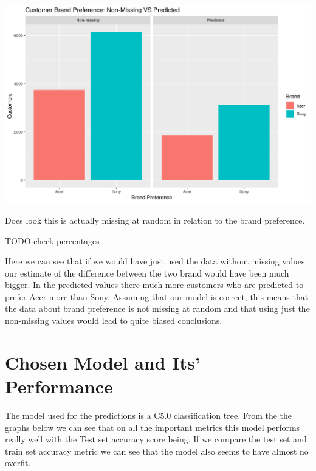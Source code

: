 \documentclass[12pt,a4paper,leqno]{report}
\theoremstyle{plain}
\theoremstyle{definition}
\theoremstyle{remark}
\begin{document}
\bigskip
{
    \centering
    \includegraphics[width=\textwidth,height=\textheight,keepaspectratio]{brand_preference_marked.png}
    \par
}
\bigskip


Does look this is actually missing at random in relation to the brand preference.

TODO check percentages

Here we can see that if we would have just used the data without missing values our estimate of the difference
between the two brand would have been much bigger. In the predicted values there much more customers who are predicted
to prefer Acer more than Sony. Assuming that our model is correct, this means that the data about brand
preference is not missing at random and that using just the non-missing values would lead to quite biased
conclusions.


\section{Chosen Model and Its' Performance}

The model used for the predictions is a C5.0 classification tree. From the the graphs below we can see that
on all the important metrics this model performs really well with the Test set accuracy score being.
If we compare the test set and train set accuracy metric we can see that the model also seems to have almost no overfit.
\end{document}

